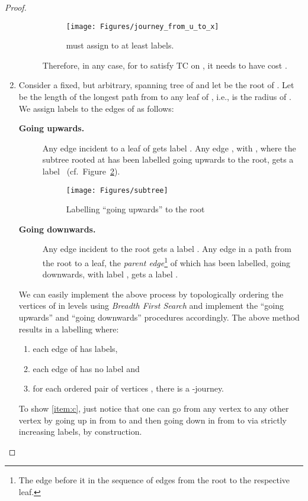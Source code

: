 \documentclass[a4paper,UKenglish]{article}
\begin{document}
\begin{proof}
\begin{enumerate}[label=(\alph*)]
\begin{description}
\begin{figure}[!htb]
\centering
\texttt{[image: Figures/journey\_from\_u\_to\_x]}
\caption{ must assign to  at least  labels.}
\label{fig:journey_from_u_to_x}
\end{figure}

Therefore, in any case, for  to satisfy TC on , it needs to have cost .
\end{description}









\item\label{item:labelling} Consider a fixed, but arbitrary, spanning tree  of  and let  be the root of . Let  be the length of the longest path from  to any leaf of , i.e.,  is the radius of . We assign labels to the edges of  as follows:
\begin{description}
\item[\textbf{Going upwards.}] Any edge incident to a leaf of  gets label . Any edge , with , where the subtree  rooted at  has been labelled going upwards to the root, gets a label ~(cf.~Figure~\ref{fig:subtree}).
\begin{figure}[!htb]
\centering
\texttt{[image: Figures/subtree]}
\caption{Labelling ``going upwards'' to the root}
\label{fig:subtree}
\end{figure}
\item[\textbf{Going downwards.}] Any edge incident to the root gets a label . Any edge  in a path from the root to a leaf, the \emph{parent edge}\footnote{The edge before it in the sequence of edges from the root to the respective leaf.} of which has been labelled, going downwards, with label , gets a label .
\end{description}
We can easily implement the above process by topologically ordering the vertices of  in levels using \emph{Breadth First Search} and implement the ``going upwards'' and ``going downwards'' procedures accordingly. The above method results in a labelling where:
\begin{enumerate}[label=\arabic*., ref=\arabic*]
\item each edge of  has  labels,
\item each edge of  has no label and
\item\label{item:c} for each ordered pair of vertices , there is a -journey.
\end{enumerate}
To show \ref{item:c}, just notice that one can go from any vertex  to any other vertex  by going up in  from  to  and then going down in  from  to  via strictly increasing labels, by construction.
\end{enumerate}
\end{proof}
\end{document}
